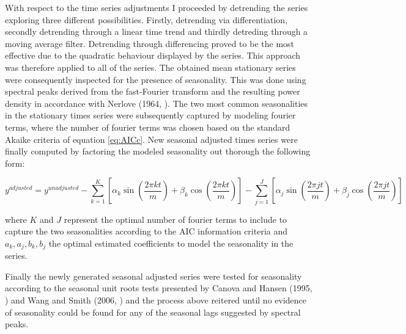 With respect to the time series adjustments I proceeded by detrending
the series exploring three different possibilities. Firstly,
detrending via differentiation, secondly detrending through a linear
time trend and thirdly detreding through a moving average
filter. Detrending through differencing proved to be the most
effective due to the quadratic behaviour displayed by the series. This
approach was therefore applied to all of the series.  The obtained
mean stationary series were consequently inspected for the presence of
seasonality. This was done using spectral peaks derived from the
fast-Fourier transform and the resulting power density in accordance
with Nerlove (1964, \cite{Nerlove}). The two most common seasonalities
in the stationary times series were subsequently captured by modeling
fourier terms, where the number of fourier terms was chosen based on
the standard Akaike criteria of equation \ref{eq:AICc}. New seasonal adjusted
times series were finally computed by factoring the modeled
seasonality out thorough the following form:

\begin{equation} \label{eq:seasonal adjustment}
  y^{adjusted} = y^{unadjusted} - \sum_{k=1}^K [ \alpha_k \sin(\frac{2 \pi kt}{m}) + \beta_k \cos(\frac{2 \pi kt}{m}) ] - \sum_{j=1}^J [ \alpha_j \sin(\frac{2 \pi jt}{m}) + \beta_j \cos(\frac{2 \pi jt}{m}) ]
\end{equation}

where $K$ and $J$ represent the optimal number of fourier terms to
include to capture the two seasonalities according to the AIC
information criteria and $a_k, a_j, b_k, b_j$ the optimal estimated
coefficients to model the seasonality in the series.

Finally the newly generated seasonal adjusted series were tested for
seasonality according to the seasonal unit roots tests presented by
Canova and Hansen (1995, \cite{CanovaHansen}) and Wang and Smith
(2006, \cite{WangSmith}) and the process above reitered until no
evidence of seasonality could be found for any of the seasonal lags
suggested by spectral peaks.
